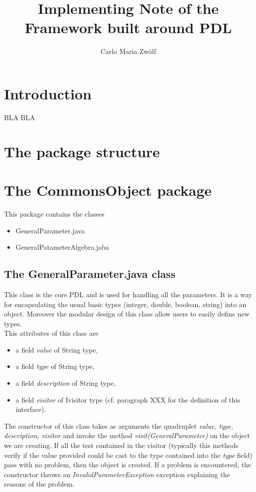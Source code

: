 \documentclass[a4paper,11pt] {ivoa}
\title{Implementing Note of the Framework built around PDL}
\author{Carlo Maria Zw\"olf}
\date{\pdldate}
\begin{document}
\maketitle

\tableofcontents

\section{Introduction}
BLA BLA

\section{The package structure}

\section{The CommonsObject package}
This package contains the classes 
\begin{itemize}
\item GeneralParameter.java
\item GeneralPatameterAlgebra.jaba
\end{itemize}

\subsection{The  GeneralParameter.java class }
This class is the core PDL and is used for handling all the parameters. It is a way for encapsulating the usual basic types (integer, double, boolean, string) into an object. Moreover the modular design of this class allow users to easily define new types.\\

This attributes of this class are
\begin{itemize}
\item a field {\it value} of String type,\\
\item a field {\it type} of String type,\\
\item a field {\it description} of String type,\\
\item a field {\it visitor} of Ivisitor type (cf. paragraph XXX for the definition of this interface).\\ 
\end{itemize}

The constructor of this class takes as arguments the quadruplet  {\it  value, type, description, visitor} and invoke the method {\it visit(GeneralParameter)} on the object we are creating. If all the test contained in the visitor (typically this methods verify if the value provided could be cast to the type contained into the {\it type} field) pass with no problem, then the object is created. If a problem is encountered, the constructor throws an {\it InvalidParameterException } exception explaining the reasons of the problem.\\
\end{document}
